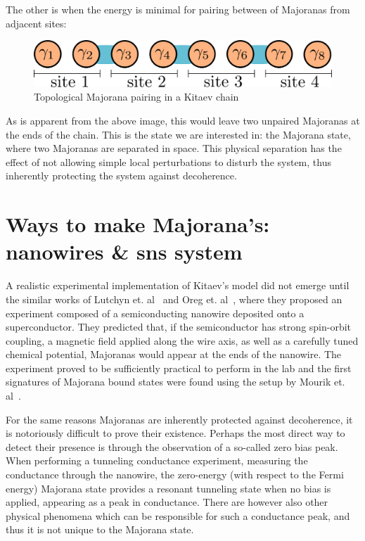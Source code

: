 	The other is when the energy is minimal for pairing between of Majoranas from adjacent sites:
	\begin{figure}[htb!]
	\centering
	\includegraphics[width=0.95\columnwidth]{images/majorana_topological_pairing}
	\caption{Topological Majorana pairing in a Kitaev chain}
	\label{fig:topological_majoranas}
	\end{figure}
		
	As is apparent from the above image, this would leave two unpaired Majoranas at the ends of the chain.
	This is the state we are interested in: the Majorana state, where two Majoranas are separated in space.
	This physical separation has the effect of not allowing simple local perturbations to disturb the system, thus inherently protecting the system against decoherence.

\section{Ways to make Majorana's: nanowires \& sns system}
	A realistic experimental implementation of Kitaev's model did not emerge until the similar works of Lutchyn et. al~\cite{lutchyn_majorana_2010} and Oreg et. al~\cite{ oreg_helical_2010}, where they proposed an experiment composed of a semiconducting nanowire deposited onto a superconductor.
	They predicted that, if the semiconductor has strong spin-orbit coupling, a magnetic field applied along the wire axis, as well as a carefully tuned chemical potential, Majoranas would appear at the ends of the nanowire.
	The experiment proved to be sufficiently practical to perform in the lab and the first signatures of Majorana bound states were found using the setup by Mourik et. al~\cite{mourik_signatures_2012}.

	For the same reasons Majoranas are inherently protected against decoherence, it is notoriously difficult to prove their existence.
	Perhaps the most direct way to detect their presence is through the observation of a so-called zero bias peak.
	When performing a tunneling conductance experiment, measuring the conductance through the nanowire, the zero-energy (with respect to the Fermi energy) Majorana state provides a resonant tunneling state when no bias is applied, appearing as a peak in conductance.
	There are however also other physical phenomena which can be responsible for such a conductance peak, and thus it is not unique to the Majorana state.

